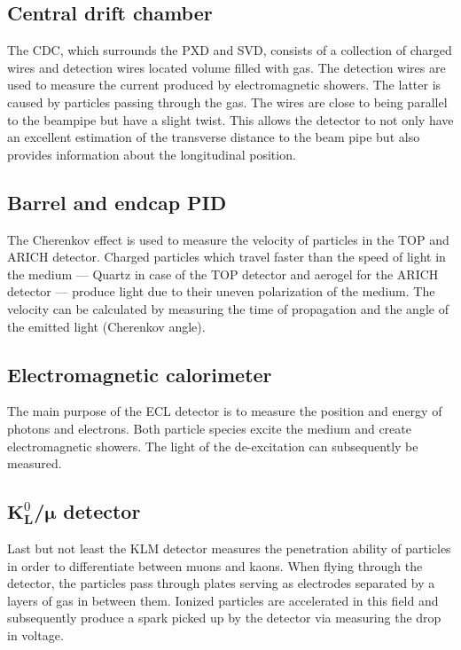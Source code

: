 \subsection{Central drift chamber}
\label{subsec:detector_system_tracking_detectors}

The CDC, which surrounds the PXD and SVD, consists of a collection of charged wires and detection wires located volume filled with gas. The detection wires are used to measure the current produced by electromagnetic showers. The latter is caused by particles passing through the gas. The wires are close to being parallel to the beampipe but have a slight twist. This allows the detector to not only have an excellent estimation of the transverse distance to the beam pipe but also provides information about the longitudinal position.

\subsection{Barrel and endcap PID}
\label{subsec:detector_system_barrel_and_endcap_pid}

The Cherenkov effect is used to measure the velocity of particles in the TOP and ARICH detector. Charged particles which travel faster than the speed of light in the medium --- Quartz in case of the TOP detector and aerogel for the ARICH detector --- produce light due to their uneven polarization of the medium. The velocity can be calculated by measuring the time of propagation and the angle of the emitted light (Cherenkov angle).

\subsection{Electromagnetic calorimeter}
\label{subsec:detector_system_electromagnetic_calorimeter}

The main purpose of the ECL detector is to measure the position and energy of photons and electrons. Both particle species excite the medium and create electromagnetic showers. The light of the de-excitation can subsequently be measured.

\subsection{$\boldsymbol{K}^0_{\boldsymbol{L}}$/$\boldsymbol{\mu}$ detector}
\label{subsec:detector_system_k0lmu}

Last but not least the KLM detector measures the penetration ability of particles in order to differentiate between muons and kaons. When flying through the detector, the particles pass through plates serving as electrodes separated by a layers of gas in between them. Ionized particles are accelerated in this field and subsequently produce a spark picked up by the detector via measuring the drop in voltage.

